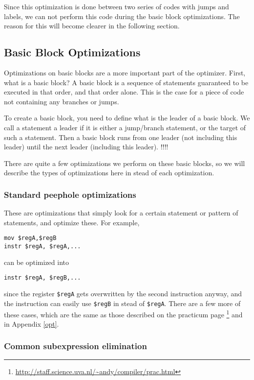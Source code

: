 \documentclass[10pt,a4paper]{article}
\begin{document}
Since this optimization is done between two series of codes with jumps and
labels, we can not perform this code during the basic block optimizations. The
reason for this will become clearer in the following section.

\subsection{Basic Block Optimizations}

Optimizations on basic blocks are a more important part of the optimizer.
First, what is a basic block? A basic block is a sequence of statements
guaranteed to be executed in that order, and that order alone. This is the case
for a piece of code not containing any branches or jumps.

To create a basic block, you need to define what is the leader of a basic
block. We call a statement a leader if it is either a jump/branch statement, or
the target of such a statement. Then a basic block runs from one leader
(not including this leader) until the next leader (including this leader). !!!!

There are quite a few optimizations we perform on these basic blocks, so we
will describe the types of optimizations here in stead of each optimization.

\subsubsection*{Standard peephole optimizations}

These are optimizations that simply look for a certain statement or pattern of
statements, and optimize these. For example,
\begin{lstlisting}
mov $regA,$regB
instr $regA, $regA,... 
\end{lstlisting}
can be optimized into
\begin{lstlisting}
instr $regA, $regB,...
\end{lstlisting}
since the register \texttt{\$regA} gets overwritten by the second instruction
anyway, and the instruction can easily use \texttt{\$regB} in stead of
\texttt{\$regA}. There are a few more of these cases, which are the same as
those described on the practicum page
\footnote{\url{http://staff.science.uva.nl/~andy/compiler/prac.html}} and in
Appendix \ref{opt}.

\subsubsection*{Common subexpression elimination}
\end{document}
